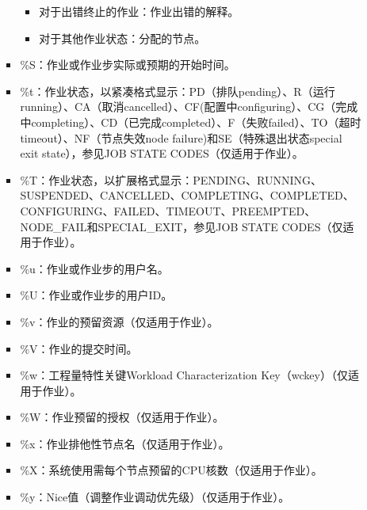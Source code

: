 \documentclass[a4paper,12pt,english]{sphinxmanual}
\begin{document}
\begin{itemize}
\begin{itemize}
\begin{itemize}
\begin{itemize}
\item {} 
\sphinxAtStartPar
对于出错终止的作业：作业出错的解释。

\item {} 
\sphinxAtStartPar
对于其他作业状态：分配的节点。

\end{itemize}

\item {} 
\sphinxAtStartPar
\%S：作业或作业步实际或预期的开始时间。

\item {} 
\sphinxAtStartPar
\%t：作业状态，以紧凑格式显示：PD（排队pending）、R（运行running）、CA（取消cancelled）、CF(配置中configuring）、CG（完成中completing）、CD（已完成completed）、F（失败failed）、TO（超时timeout）、NF（节点失效node failure)和SE（特殊退出状态special exit state），参见JOB STATE CODES（仅适用于作业）。

\item {} 
\sphinxAtStartPar
\%T：作业状态，以扩展格式显示：PENDING、RUNNING、SUSPENDED、CANCELLED、COMPLETING、COMPLETED、CONFIGURING、FAILED、TIMEOUT、PREEMPTED、NODE\_FAIL和SPECIAL\_EXIT，参见JOB STATE CODES（仅适用于作业）。

\item {} 
\sphinxAtStartPar
\%u：作业或作业步的用户名。

\item {} 
\sphinxAtStartPar
\%U：作业或作业步的用户ID。

\item {} 
\sphinxAtStartPar
\%v：作业的预留资源（仅适用于作业）。

\item {} 
\sphinxAtStartPar
\%V：作业的提交时间。

\item {} 
\sphinxAtStartPar
\%w：工程量特性关键Workload Characterization Key（wckey）（仅适用于作业）。

\item {} 
\sphinxAtStartPar
\%W：作业预留的授权（仅适用于作业）。

\item {} 
\sphinxAtStartPar
\%x：作业排他性节点名（仅适用于作业）。

\item {} 
\sphinxAtStartPar
\%X：系统使用需每个节点预留的CPU核数（仅适用于作业）。

\item {} 
\sphinxAtStartPar
\%y：Nice值（调整作业调动优先级）（仅适用于作业）。


\end{itemize}
\end{itemize}
\end{itemize}
\end{document}
